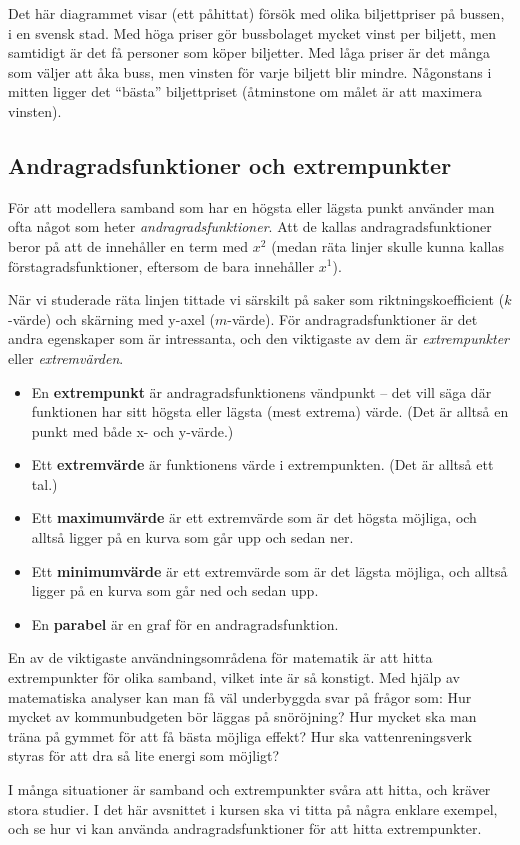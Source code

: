 Det här diagrammet visar (ett påhittat) försök med olika biljettpriser på bussen, i en svensk stad.
Med höga priser gör bussbolaget mycket vinst per biljett, men samtidigt är det få personer som köper biljetter.
Med låga priser är det många som väljer att åka buss, men vinsten för varje biljett blir mindre.
Någonstans i mitten ligger det ``bästa'' biljettpriset (åtminstone om målet är att maximera vinsten).

\subsection {Andragradsfunktioner och extrempunkter}

För att modellera samband som har en högsta eller lägsta punkt använder man ofta något som heter \emph{andragradsfunktioner}.
Att de kallas andragradsfunktioner beror på att de innehåller en term med $x^2$ (medan räta linjer skulle kunna kallas förstagradsfunktioner, eftersom de bara innehåller $x^1$).

När vi studerade räta linjen tittade vi särskilt på saker som riktningskoefficient ($k$-värde) och skärning med y-axel ($m$-värde).
För andragradsfunktioner är det andra egenskaper som är intressanta, och den viktigaste av dem är \emph{extrempunkter} eller \emph{extremvärden}.

\begin{itemize}
  \item En \textbf{extrempunkt} är andragradsfunktionens vändpunkt -- det vill säga där funktionen har sitt högsta eller lägsta (mest extrema) värde. (Det är alltså en punkt med både x- och y-värde.)
  \item Ett \textbf{extremvärde} är funktionens värde i extrempunkten. (Det är alltså ett tal.)
  \item Ett \textbf{maximumvärde} är ett extremvärde som är det högsta möjliga, och alltså ligger på en kurva som går upp och sedan ner.
  \item Ett \textbf{minimumvärde} är ett extremvärde som är det lägsta möjliga, och alltså ligger på en kurva som går ned och sedan upp.
  \item En \textbf{parabel} är en graf för en andragradsfunktion.
\end{itemize}

En av de viktigaste användningsområdena för matematik är att hitta extrempunkter för olika samband, vilket inte är så konstigt.
Med hjälp av matematiska analyser kan man få väl underbyggda svar på frågor som:
Hur mycket av kommunbudgeten bör läggas på snöröjning?
Hur mycket ska man träna på gymmet för att få bästa möjliga effekt?
Hur ska vattenreningsverk styras för att dra så lite energi som möjligt?

I många situationer är samband och extrempunkter svåra att hitta, och kräver stora studier.
I det här avsnittet i kursen ska vi titta på några enklare exempel, och se hur vi kan använda andragradsfunktioner för att hitta extrempunkter.

